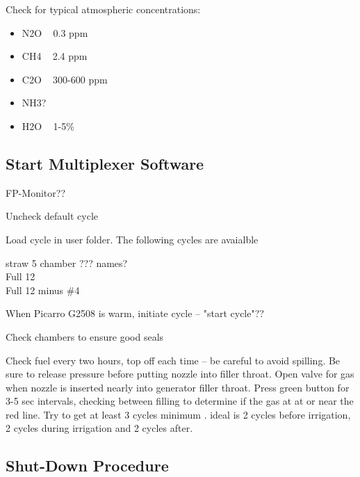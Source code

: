 \documentclass[12pt]{../SOP3}\usepackage[]{graphicx}\usepackage[]{color}
\begin{document}
\NP Check for typical atmospheric concentrations:
                                 
\begin{itemize}
  \item N2O ~ 0.3 ppm
  \item CH4 ~ 2.4 ppm
  \item C2O ~ 300-600 ppm
  \item NH3?
  \item H2O ~ 1-5\%
\end{itemize}
                               
\subsection*{Start Multiplexer Software}

\NP FP-Monitor??
                               
\NP Uncheck default cycle
                               
\NP Load cycle in user folder. The following cycles are avaialble 

\begin{description}
  \item[straw 5 chamber ??? names?]
  \item[Full 12]
  \item[Full 12 minus \#4]
\end{description}
                               
\NP When Picarro G2508 is warm, initiate cycle -- "start cycle"??
                               
\NP Check chambers to ensure good seals
                               
\NP Check fuel every two hours, top off each time -- be careful to avoid spilling. Be sure to release pressure before putting nozzle into filler throat. Open valve for gas when nozzle is inserted nearly into generator filler throat. Press green button for 3-5 sec intervals, checking between filling to determine if the gas at at or near the red line.
                               Try to get at least 3 cycles minimum . ideal is 2 cycles before irrigation, 2 cycles during irrigation and 2 cycles after. 
                               
\subsection*{Shut-Down Procedure}
                               
\end{document}
